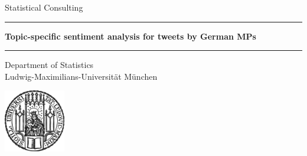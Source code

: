 \documentclass[12pt]{article}
\begin{document}


 
\begin{titlepage}
\begin{center}
    
\large
Statistical Consulting
    
\vspace{0.3cm}
      
\rule{\textwidth}{1pt}
\textbf{Topic-specific sentiment analysis for tweets by German MPs}
\rule{\textwidth}{1pt}
   
\vspace{0.3cm}
      
\normalsize
Department of Statistics \\
Ludwig-Maximilians-Universität München 

\vspace{0.3cm}

\includegraphics[width = 0.2\textwidth]{figures/sigillum.png}

\vspace{0.3cm}


\end{center}
\end{titlepage}
\end{document}
